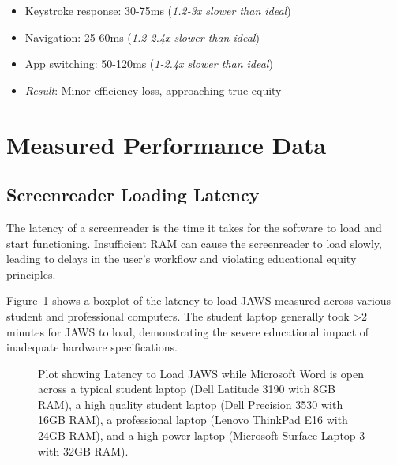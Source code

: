 \begin{itemize}
\item Keystroke response: 30-75ms (\emph{1.2-3x slower than ideal})
\item Navigation: 25-60ms (\emph{1.2-2.4x slower than ideal})
\item App switching: 50-120ms (\emph{1-2.4x slower than ideal})
\item \emph{Result}: Minor efficiency loss, approaching true equity
\end{itemize}

\hypertarget{measured-performance-data}{}\section{Measured Performance Data}\label{measured-performance-data}

\subsection{Screenreader Loading Latency}\label{screenreader-loading-latency}

The latency of a screenreader is the time it takes for the software to load and start functioning. Insufficient RAM can cause the screenreader to load slowly, leading to delays in the user's workflow and violating educational equity principles.

Figure~\ref{fig:figure1} shows a boxplot of the latency to load JAWS measured across various student and professional computers. The student laptop generally took >2 minutes for JAWS to load, demonstrating the severe educational impact of inadequate hardware specifications.

\begin{figure}[htbp]
\centering
{}
\caption[Latency to Load JAWS]{Plot showing Latency to Load JAWS while Microsoft Word is open across a typical student laptop (Dell Latitude 3190 with 8GB RAM), a high quality student laptop (Dell Precision 3530 with 16GB RAM), a professional laptop (Lenovo ThinkPad E16 with 24GB RAM), and a high power laptop (Microsoft Surface Laptop 3 with 32GB RAM).}\label{fig:figure1}
\tagstructend
\end{figure}

